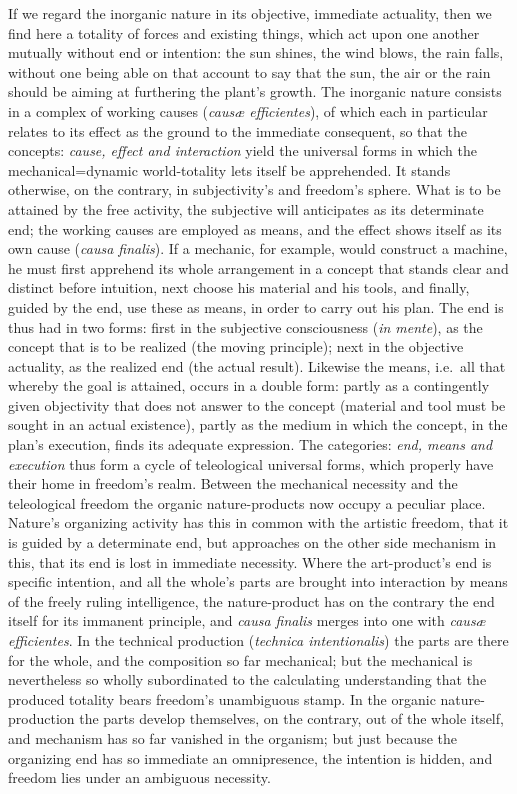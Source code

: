 \documentclass[12pt]{book}
\begin{document}
If we regard the inorganic nature in its objective, immediate actuality,
then we find here a totality of forces and existing things, which act upon
one another mutually without end or intention: the sun shines, the wind
blows, the rain falls, without one being able on that account to say that
the sun, the air or the rain should be aiming at furthering the plant's
growth. The inorganic nature consists in a complex of working causes
(\textit{causæ efficientes}), of which each in particular relates to its
effect as the ground to the immediate consequent, so that the concepts:
\emph{cause, effect and interaction} yield the universal forms in which the
mechanical=dynamic world-totality lets itself be apprehended. It stands
otherwise, on the contrary, in subjectivity's and freedom's sphere. What is
to be attained by the free activity, the subjective will anticipates as its
determinate end; the working causes are employed as means, and the effect
shows itself as its own cause (\textit{causa finalis}). If a mechanic, for
example, would construct a machine, he must first apprehend its whole
arrangement in a concept that stands clear and distinct before intuition,
next choose his material and his tools, and finally, guided by the end, use
these as means, in order to carry out his plan. The end is thus had in two
forms: first in the subjective consciousness (\textit{in mente}), as the
concept that is to be realized (the moving principle); next in the objective
actuality, as the realized end (the actual result). Likewise the means,
i.e.\ all that whereby the goal is attained, occurs in a double form: partly
as a contingently given objectivity that does not answer to the concept
(material and tool must be sought in an actual existence), partly as the
medium in which the concept, in the plan's execution, finds its adequate
expression. The categories: \emph{end, means and execution} thus form a
cycle of teleological universal forms, which properly have their home in
freedom's realm. Between the mechanical necessity and the teleological
freedom the organic nature-products now occupy a peculiar place. Nature's
organizing activity has this in common with the artistic freedom, that it is
guided by a determinate end, but approaches on the other side mechanism in
this, that its end is lost in immediate necessity. Where the art-product's
end is specific intention, and all the whole's parts are brought into
interaction by means of the freely ruling intelligence, the nature-product
has on the contrary the end itself for its immanent principle, and
\textit{causa finalis} merges into one with \textit{causæ efficientes}. In
the technical production (\textit{technica intentionalis}) the parts are
there for the whole, and the composition so far mechanical; but the
mechanical is nevertheless so wholly subordinated to the calculating
understanding that the produced totality bears freedom's unambiguous stamp.
In the organic nature-production the parts develop themselves, on the
contrary, out of the whole itself, and mechanism has so far vanished in the
organism; but just because the organizing end has so immediate an
omnipresence, the intention is hidden, and freedom lies under an ambiguous
necessity.
\end{document}
